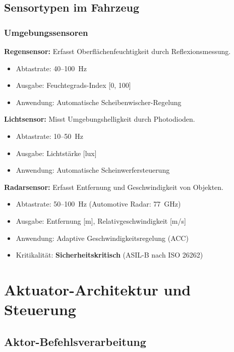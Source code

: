 ﻿\documentclass[a4paper,12pt]{article}
\begin{document}
\subsection{Sensortypen im Fahrzeug}

\subsubsection{Umgebungssensoren}

\textbf{Regensensor:} Erfasst Oberflächenfeuchtigkeit durch Reflexionsmessung.
\begin{itemize}
	\item Abtastrate: 40--100~Hz
	\item Ausgabe: Feuchtegrads-Index [0, 100]
	\item Anwendung: Automatische Scheibenwischer-Regelung
\end{itemize}

\textbf{Lichtsensor:} Misst Umgebungshelligkeit durch Photodioden.
\begin{itemize}
	\item Abtastrate: 10--50~Hz
	\item Ausgabe: Lichtstärke [lux]
	\item Anwendung: Automatische Scheinwerfersteuerung
\end{itemize}

\textbf{Radarsensor:} Erfasst Entfernung und Geschwindigkeit von Objekten.
\begin{itemize}
	\item Abtastrate: 50--100~Hz (Automotive Radar: 77~GHz)
	\item Ausgabe: Entfernung [m], Relativgeschwindigkeit [m/s]
	\item Anwendung: Adaptive Geschwindigkeitsregelung (ACC)
	\item Kritikalität: \textbf{Sicherheitskritisch} (ASIL-B nach ISO 26262)
\end{itemize}

\section{Aktuator-Architektur und Steuerung}

\subsection{Aktor-Befehlsverarbeitung}
\end{document}
